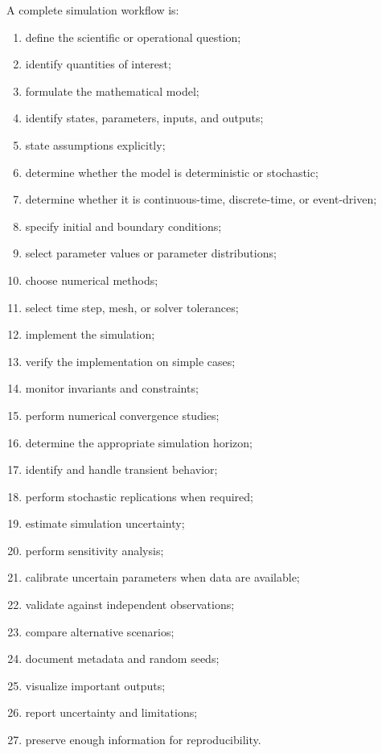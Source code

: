 A complete simulation workflow is:

\begin{enumerate}
    \item define the scientific or operational question;
    \item identify quantities of interest;
    \item formulate the mathematical model;
    \item identify states, parameters, inputs, and outputs;
    \item state assumptions explicitly;
    \item determine whether the model is deterministic or stochastic;
    \item determine whether it is continuous-time, discrete-time, or
          event-driven;
    \item specify initial and boundary conditions;
    \item select parameter values or parameter distributions;
    \item choose numerical methods;
    \item select time step, mesh, or solver tolerances;
    \item implement the simulation;
    \item verify the implementation on simple cases;
    \item monitor invariants and constraints;
    \item perform numerical convergence studies;
    \item determine the appropriate simulation horizon;
    \item identify and handle transient behavior;
    \item perform stochastic replications when required;
    \item estimate simulation uncertainty;
    \item perform sensitivity analysis;
    \item calibrate uncertain parameters when data are available;
    \item validate against independent observations;
    \item compare alternative scenarios;
    \item document metadata and random seeds;
    \item visualize important outputs;
    \item report uncertainty and limitations;
    \item preserve enough information for reproducibility.
\end{enumerate}

